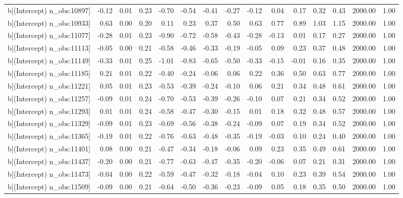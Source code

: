 \begin{table}[ht]
\begin{tabular}{rrrrrrrrrrrrrrr}
  b[(Intercept) n\_obs:10897] & -0.12 & 0.01 & 0.23 & -0.70 & -0.54 & -0.41 & -0.27 & -0.12 & 0.04 & 0.17 & 0.32 & 0.43 & 2000.00 & 1.00 \\ 
  b[(Intercept) n\_obs:10933] & 0.63 & 0.00 & 0.20 & 0.11 & 0.23 & 0.37 & 0.50 & 0.63 & 0.77 & 0.89 & 1.03 & 1.15 & 2000.00 & 1.00 \\ 
  b[(Intercept) n\_obs:11077] & -0.28 & 0.01 & 0.23 & -0.90 & -0.72 & -0.58 & -0.43 & -0.28 & -0.13 & 0.01 & 0.17 & 0.27 & 2000.00 & 1.00 \\ 
  b[(Intercept) n\_obs:11113] & -0.05 & 0.00 & 0.21 & -0.58 & -0.46 & -0.33 & -0.19 & -0.05 & 0.09 & 0.23 & 0.37 & 0.48 & 2000.00 & 1.00 \\ 
  b[(Intercept) n\_obs:11149] & -0.33 & 0.01 & 0.25 & -1.01 & -0.83 & -0.65 & -0.50 & -0.33 & -0.15 & -0.01 & 0.16 & 0.35 & 2000.00 & 1.00 \\ 
  b[(Intercept) n\_obs:11185] & 0.21 & 0.01 & 0.22 & -0.40 & -0.24 & -0.06 & 0.06 & 0.22 & 0.36 & 0.50 & 0.63 & 0.77 & 2000.00 & 1.00 \\ 
  b[(Intercept) n\_obs:11221] & 0.05 & 0.01 & 0.23 & -0.53 & -0.39 & -0.24 & -0.10 & 0.06 & 0.21 & 0.34 & 0.48 & 0.61 & 2000.00 & 1.00 \\ 
  b[(Intercept) n\_obs:11257] & -0.09 & 0.01 & 0.24 & -0.70 & -0.53 & -0.39 & -0.26 & -0.10 & 0.07 & 0.21 & 0.34 & 0.52 & 2000.00 & 1.00 \\ 
  b[(Intercept) n\_obs:11293] & 0.01 & 0.01 & 0.24 & -0.58 & -0.47 & -0.30 & -0.15 & 0.01 & 0.18 & 0.32 & 0.48 & 0.57 & 2000.00 & 1.00 \\ 
  b[(Intercept) n\_obs:11329] & -0.09 & 0.01 & 0.23 & -0.69 & -0.56 & -0.38 & -0.24 & -0.09 & 0.07 & 0.19 & 0.34 & 0.52 & 2000.00 & 1.00 \\ 
  b[(Intercept) n\_obs:11365] & -0.19 & 0.01 & 0.22 & -0.76 & -0.63 & -0.48 & -0.35 & -0.19 & -0.03 & 0.10 & 0.24 & 0.40 & 2000.00 & 1.00 \\ 
  b[(Intercept) n\_obs:11401] & 0.08 & 0.00 & 0.21 & -0.47 & -0.34 & -0.18 & -0.06 & 0.09 & 0.23 & 0.35 & 0.49 & 0.61 & 2000.00 & 1.00 \\ 
  b[(Intercept) n\_obs:11437] & -0.20 & 0.00 & 0.21 & -0.77 & -0.63 & -0.47 & -0.35 & -0.20 & -0.06 & 0.07 & 0.21 & 0.31 & 2000.00 & 1.00 \\ 
  b[(Intercept) n\_obs:11473] & -0.04 & 0.00 & 0.22 & -0.59 & -0.47 & -0.32 & -0.18 & -0.04 & 0.10 & 0.23 & 0.39 & 0.54 & 2000.00 & 1.00 \\ 
  b[(Intercept) n\_obs:11509] & -0.09 & 0.00 & 0.21 & -0.64 & -0.50 & -0.36 & -0.23 & -0.09 & 0.05 & 0.18 & 0.35 & 0.50 & 2000.00 & 1.00 \\ 

\end{tabular}
\end{table}
